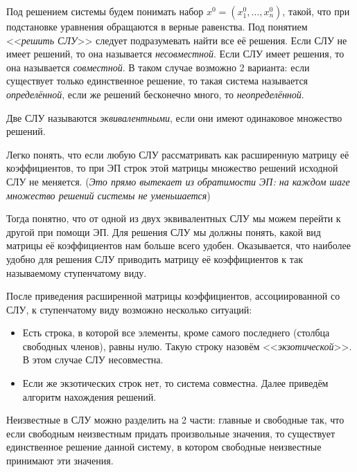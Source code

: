 \begin{df}
  Под решением системы будем понимать набор $x^0 = (x_1^0,\ldots,x_n^0)$, такой, что при подстановке уравнения обращаются в верные равенства. Под понятием <<\emph{решить СЛУ}>> следует подразумевать найти все её решения. Если СЛУ не имеет решений, то она называется \emph{несовместной}. Если СЛУ имеет решения, то она называется \emph{совместной}. В таком случае возможно 2 варианта: если существует только единственное решение, то такая система называется \emph{определённой}, если же решений бесконечно много, то \emph{неопределённой}.%
\end{df}

\begin{df}
  Две СЛУ называются \emph{эквивалентными}, если они имеют одинаковое множество решений.
\end{df}

Легко понять, что если любую СЛУ рассматривать как расширенную матрицу её коэффициентов, то при ЭП строк этой матрицы множество решений исходной СЛУ не меняется. (\emph{Это прямо вытекает из обратимости ЭП: на каждом шаге множество решений системы не уменьшается})

 Тогда понятно, что от одной из двух эквивалентных СЛУ мы можем перейти к другой при помощи ЭП. Для решения СЛУ мы должны понять, какой вид матрицы её коэффициентов нам больше всего удобен. Оказывается, что наиболее удобно для решения СЛУ приводить матрицу её коэффициентов к так называемому ступенчатому виду.
 
  После приведения расширенной матрицы коэффициентов, ассоциированной со СЛУ, к ступенчатому виду возможно несколько ситуаций:
  \begin{itemize}
    \item Есть строка, в которой все элементы, кроме самого последнего (столбца свободных членов), равны нулю. Такую строку назовём <<\emph{экзотической}>>. В этом случае СЛУ несовместна.
    \item Если же экзотических строк нет, то система совместна. Далее приведём алгоритм нахождения решений.
  \end{itemize}
  
  Неизвестные в СЛУ можно разделить на 2 части: главные и свободные так, что если свободным неизвестным придать произвольные значения, то существует единственное решение данной систему, в котором свободные неизвестные принимают эти значения.
  
